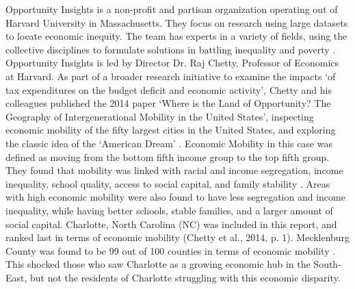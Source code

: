 Opportunity Insights is a non-profit and partisan organization operating out of Harvard University in Massachusetts. They focus on research using large datasets to locate economic inequity. 
The team has experts in a variety of fields, using the collective disciplines to formulate solutions in battling inequality and poverty \parencite{opportunityinsights}.
Opportunity Insights is led by Director Dr. Raj Chetty, Professor of Economics at Harvard. 
As part of a broader research initiative to examine the impacts `of  tax  expenditures  on  the  budget  deficit  and  economic  activity', Chetty and his colleagues published the 2014 paper `Where is the Land of Opportunity? The Geography of Intergenerational Mobility in the United States', inspecting economic mobility of the fifty largest cities in the United States, and exploring the classic idea of the `American Dream' \parencite{opportunityinsights, chetty2014}.
Economic Mobility in this case was defined as moving from the bottom fifth income group to the top fifth group. 
They found that mobility was linked with racial and income segregation, income inequality, school quality, access to social capital, and family stability \parencite{chetty2014}.
Areas with high economic mobility were also found to have less segregation and income inequality, while having better schools, stable families, and a larger amount of social capital\parencite{chetty2014}.
Charlotte, North Carolina (NC) was included in this report, and ranked last in terms of economic mobility (Chetty et al., 2014, p. 1). Mecklenburg County was found to be 99 out of 100 counties in terms of economic mobility \parencite{opportunityinsights}. This shocked those who saw Charlotte as a growing economic hub in the South-East, but not the residents of Charlotte struggling with this economic disparity. 

